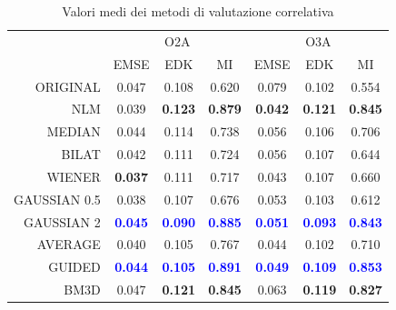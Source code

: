 \documentclass[../main.tex]{subfiles}
\begin{document}
\begin{table}[ht]
	\centering
	\begin{tabular}{r||ccc||ccc}
		& \multicolumn{3}{c||}{O2A} & \multicolumn{3}{c}{O3A} \\
		& EMSE & EDK & MI & EMSE & EDK & MI \\
		\hline\hline
		ORIGINAL     & 0.047 & 0.108 & 0.620 & 0.079 & 0.102 & 0.554 \\
		NLM          & 0.039 & \textbf{0.123} & \textbf{0.879} & \textbf{0.042} & \textbf{0.121} & \textbf{0.845} \\
		MEDIAN       & 0.044 & 0.114 & 0.738 & 0.056 & 0.106 & 0.706 \\
		BILAT        & 0.042 & 0.111 & 0.724 & 0.056 & 0.107 & 0.644 \\
		WIENER       & \textbf{0.037} & 0.111 & 0.717 & 0.043 & 0.107 & 0.660 \\
		GAUSSIAN 0.5 & 0.038 & 0.107 & 0.676 & 0.053 & 0.103 & 0.612 \\
		GAUSSIAN 2   & \textcolor{blue}{\textbf{0.045}} & \textcolor{blue}{\textbf{0.090}} & \textcolor{blue}{\textbf{0.885}} & \textcolor{blue}{\textbf{0.051}} & \textcolor{blue}{\textbf{0.093}} & \textcolor{blue}{\textbf{0.843}} \\
		AVERAGE      & 0.040 & 0.105 & 0.767 & 0.044 & 0.102 & 0.710 \\
		GUIDED       & \textcolor{blue}{\textbf{0.044}} & \textcolor{blue}{\textbf{0.105}} & \textcolor{blue}{\textbf{0.891}} & \textcolor{blue}{\textbf{0.049}} & \textcolor{blue}{\textbf{0.109}} & \textcolor{blue}{\textbf{0.853}} \\
		BM3D         & 0.047 & \textbf{0.121} & \textbf{0.845} & 0.063 & \textbf{0.119} & \textbf{0.827}
	\end{tabular}
	\caption{Valori medi dei metodi di valutazione correlativa}
\end{table}
\end{document}
